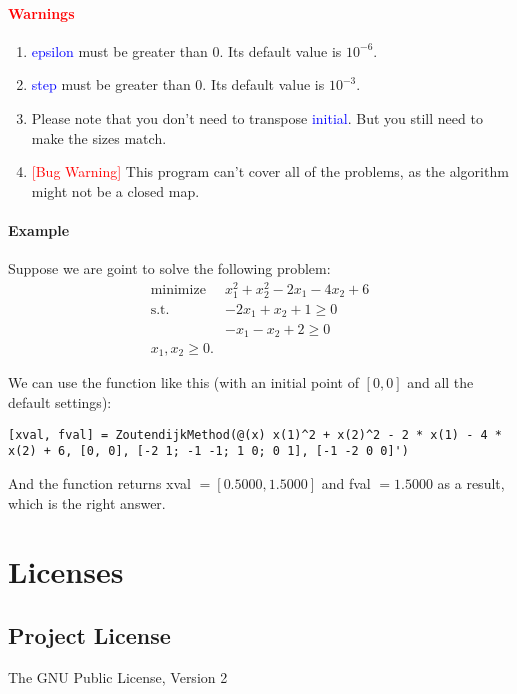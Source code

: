 \documentclass{article}
\begin{document}
\paragraph{\textcolor{red}{Warnings}}
\begin{enumerate}
    \item \textcolor{blue}{epsilon} must be greater than $0$. Its default value is $10^{-6}$.
    \item \textcolor{blue}{step} must be greater than $0$. Its default value is $10^{-3}$.
    \item Please note that you don't need to transpose \textcolor{blue}{initial}. But you still need to make the sizes match.
    \item \textcolor{red}{[Bug Warning]} This program can't cover all of the problems, as the algorithm might not be a closed map.
\end{enumerate}

\paragraph{Example}
Suppose we are goint to solve the following problem:
\begin{align*}
    \mbox{minimize } &  x_1^2 + x_2^2 - 2x_1 - 4x_2 + 6 \\
    \mbox{s.t. } & -2x_1 + x_2 + 1 \geqslant 0 \\
                 & -x_1 - x_2 + 2 \geqslant 0 \\
                 x_1, x_2 \geqslant 0.
\end{align*}

We can use the function like this (with an initial point of $[0, 0]$ and all the default settings):
\begin{verbatim}
[xval, fval] = ZoutendijkMethod(@(x) x(1)^2 + x(2)^2 - 2 * x(1) - 4 * x(2) + 6, [0, 0], [-2 1; -1 -1; 1 0; 0 1], [-1 -2 0 0]')
\end{verbatim}

And the function returns xval $=[0.5000, 1.5000]$ and fval $= 1.5000$ as a result, which is the right answer.

\section{Licenses}
\subsection{Project License}
\begin{center}
    The GNU Public License, Version 2
\end{center}
\end{document}
